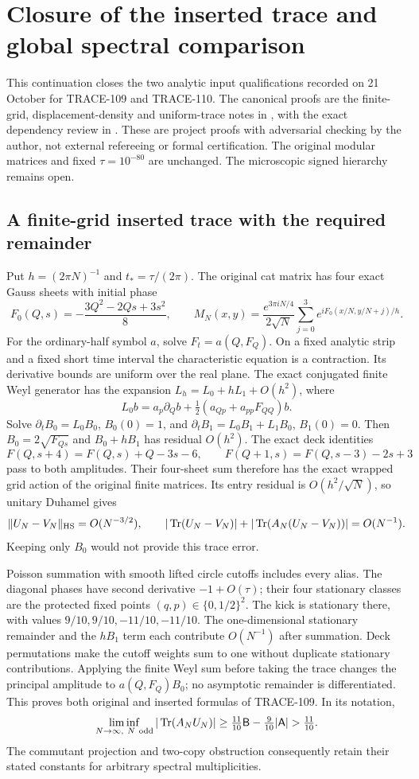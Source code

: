 \section{Closure of the inserted trace and global spectral comparison}
\label{sec:trace-closure-20261022}

This continuation closes the two analytic input qualifications recorded on
21 October for TRACE-109 and TRACE-110. The canonical proofs are the
finite-grid, displacement-density and uniform-trace notes in
, with the exact dependency review in
. These are project proofs with
adversarial checking by the author, not external refereeing or formal certification.
The original modular matrices and fixed $\tau=10^{-80}$ are unchanged.
The microscopic signed hierarchy remains open.

\subsection{A finite-grid inserted trace with the required remainder}
Put $h=(2\pi N)^{-1}$ and $t_*=\tau/(2\pi)$. The original cat matrix has
four exact Gauss sheets with initial phase
\[
F_0(Q,s)=-\frac{3Q^2-2Qs+3s^2}{8},\qquad
M_N(x,y)=\frac{e^{3\pi iN/4}}{2\sqrt N}
\sum_{j=0}^3e^{iF_0(x/N,y/N+j)/h}.
\]
For the ordinary-half symbol $a$, solve $F_t=a(Q,F_Q)$. On a fixed
analytic strip and a fixed short time interval the characteristic equation
is a contraction. Its derivative bounds are uniform over the real plane.
The exact conjugated finite Weyl generator has the expansion
$L_h=L_0+hL_1+O(h^2)$, where
\[
L_0b=a_p\partial_Qb+\tfrac12(a_{Qp}+a_{pp}F_{QQ})b.
\]
Solve $\partial_tB_0=L_0B_0$, $B_0(0)=1$, and
$\partial_tB_1=L_0B_1+L_1B_0$, $B_1(0)=0$.
Then $B_0=2\sqrt{F_{Qs}}$ and $B_0+hB_1$ has residual $O(h^2)$.
The exact deck identities
\[
F(Q,s+4)=F(Q,s)+Q-3s-6,\qquad
F(Q+1,s)=F(Q,s-3)-2s+3
\]
pass to both amplitudes. Their four-sheet sum therefore has the exact
wrapped grid action of the original finite matrices.
Its entry residual is $O(h^2/\sqrt N)$, so unitary Duhamel gives
\[
\|U_N-V_N\|_{\rm HS}=O(N^{-3/2}),\qquad
|\operatorname{Tr}(U_N-V_N)|+
|\operatorname{Tr}(A_N(U_N-V_N))|=O(N^{-1}).
\]
Keeping only $B_0$ would not provide this trace error.

Poisson summation with smooth lifted circle cutoffs includes every alias.
The diagonal phases have second derivative $-1+O(\tau)$; their four
stationary classes are the protected fixed points $(q,p)\in\{0,1/2\}^2$.
The kick is stationary there, with values $9/10,9/10,-11/10,-11/10$.
The one-dimensional stationary remainder and the $hB_1$ term each
contribute $O(N^{-1})$ after summation. Deck permutations make the cutoff
weights sum to one without duplicate stationary contributions.
Applying the finite Weyl sum before taking the trace changes the principal
amplitude to $a(Q,F_Q)B_0$; no asymptotic remainder is differentiated.
This proves both original and inserted formulas of TRACE-109. In its
notation,
\[
\liminf_{N\to\infty,\ N\ {\rm odd}}
|\operatorname{Tr}(A_NU_N)|\ge
\tfrac{11}{10}\mathsf B-\tfrac9{10}|\mathsf A|>\tfrac{11}{10}.
\]
The commutant projection and two-copy obstruction consequently retain their
stated constants for arbitrary spectral multiplicities.

